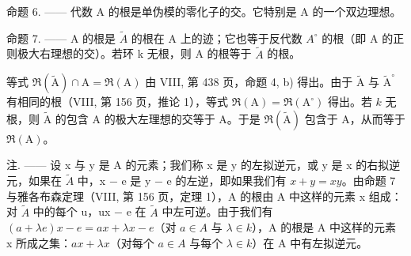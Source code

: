 命题 6. —— 代数 A 的根是单伪模的零化子的交。它特别是 A 的一个双边理想。

命题 7. —— A 的根是 \(\widetilde{A}\) 的根在 A 上的迹；它也等于反代数 \(A^{\circ}\) 的根（即 A 的正则极大右理想的交）。若环 k 无根，则 A 的根等于 \(\widetilde{A}\) 的根。

等式 \(\Re (\widetilde{\mathrm{A}})\cap \mathrm{A} = \Re (\mathrm{A})\) 由 VIII, 第 438 页，命题 4, b) 得出。由于 \(\widetilde{\mathrm{A}}\) 与 \(\widetilde{\mathrm{A}}^{\circ}\) 有相同的根（VIII, 第 156 页，推论 1），等式 \(\Re (\mathrm{A}) = \Re (\mathrm{A}^{\circ})\) 得出。若 \(k\) 无根，则 \(\widetilde{\mathrm{A}}\) 的包含 A 的极大左理想的交等于 A。于是 \(\Re (\widetilde{\mathrm{A}})\) 包含于 A，从而等于 \(\Re (\mathrm{A})\)。

注. —— 设 x 与 y 是 A 的元素；我们称 x 是 y 的左拟逆元，或 y 是 x 的右拟逆元，如果在 \(\widetilde{A}\) 中，x − e 是 y − e 的左逆，即如果我们有 \(x + y = xy\)。由命题 7 与雅各布森定理（VIII, 第 156 页，定理 1），A 的根由 A 中这样的元素 x 组成：对 \(\widetilde{A}\) 中的每个 u，ux − e 在 \(\widetilde{A}\) 中左可逆。由于我们有 \((a + \lambda e)x - e = ax + \lambda x - e\)（对 \(a \in A\) 与 \(\lambda \in k\)），A 的根是 A 中这样的元素 x 所成之集：\(ax + \lambda x\)（对每个 \(a \in A\) 与每个 \(\lambda \in k\)）在 A 中有左拟逆元。

